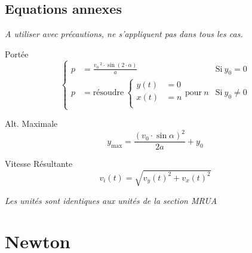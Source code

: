 \documentclass[12pt,a4paper]{article} %
\begin{document}
\subsection{Equations annexes}
\emph{A utiliser avec précautions, ne s'appliquent pas dans tous les cas.}
\par\vspace{1em}
\begin{twocols}[0.5][0.4][t]
	Port\'ee
	\begin{equation*}
		\left\{
		\begin{array}{rll}
			p &= {\displaystyle \frac{v_0\,^2 \cdot \sin (2 \cdot \alpha)}{a}} & \text{Si}\:y_0 = 0 \\[1em]
			p &= \text{résoudre}\:\left\{
					\begin{aligned}
						y(t) &= 0 \\
						x(t) &= n \\
					\end{aligned}
			\right.
				\text{pour} \: n
			 & \text{Si}\:y_0 \neq 0
		\end{array}
		\right.
	\end{equation*}

\nextcol

	Alt. Maximale
	\begin{equation*}
		y_\text{max} = \frac{(v_0\cdot\sin{\alpha})^2}{2a} + y_0
	\end{equation*}

	Vitesse Résultante
	\begin{equation*}
		v_i(t) = \sqrt{v_y(t)^2 + v_x(t)^2}
	\end{equation*}

\end{twocols}

\vspace{1em}
\emph{Les unités sont identiques aux unités de la section MRUA}

\newpage

\section{Newton}
\end{document}
